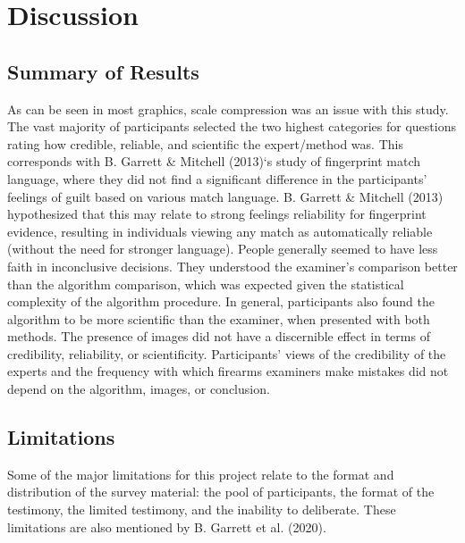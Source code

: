 \documentclass[print]{nuthesis}
\begin{document}
\hypertarget{discussion}{%
\section{Discussion}\label{discussion}}

\hypertarget{summary-of-results}{%
\subsection{Summary of Results}\label{summary-of-results}}

As can be seen in most graphics, scale compression was an issue with this study.
The vast majority of participants selected the two highest categories for questions rating how credible, reliable, and scientific the expert/method was.
This corresponds with B. Garrett \& Mitchell (2013)`s study of fingerprint match language, where they did not find a significant difference in the participants' feelings of guilt based on various match language.
B. Garrett \& Mitchell (2013) hypothesized that this may relate to strong feelings reliability for fingerprint evidence, resulting in individuals viewing any match as automatically reliable (without the need for stronger language).
People generally seemed to have less faith in inconclusive decisions.
They understood the examiner's comparison better than the algorithm comparison, which was expected given the statistical complexity of the algorithm procedure.
In general, participants also found the algorithm to be more scientific than the examiner, when presented with both methods.
The presence of images did not have a discernible effect in terms of credibility, reliability, or scientificity.
Participants' views of the credibility of the experts and the frequency with which firearms examiners make mistakes did not depend on the algorithm, images, or conclusion.

\hypertarget{limitations}{%
\subsection{Limitations}\label{limitations}}

Some of the major limitations for this project relate to the format and distribution of the survey material: the pool of participants, the format of the testimony, the limited testimony, and the inability to deliberate.
These limitations are also mentioned by B. Garrett et al. (2020).
\end{document}
